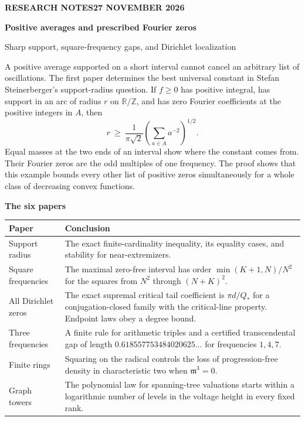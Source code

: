 \documentclass[11pt]{article}
\begin{document}
{\sffamily\color{pine}\small\bfseries RESEARCH NOTES\hfill 27 NOVEMBER 2026}\par
\vspace{9pt}
{\sffamily\bfseries\color{ink}\fontsize{26}{29}\selectfont Positive averages and prescribed Fourier zeros}\par
{\large Sharp support, square-frequency gaps, and Dirichlet localization}\par
\vspace{6pt}
A positive average supported on a short interval cannot cancel an arbitrary list of oscillations. The first paper determines the best universal constant in Stefan Steinerberger's support-radius question. If $f\ge0$ has positive integral, has support in an arc of radius $r$ on $\mathbb R/\mathbb Z$, and has zero Fourier coefficients at the positive integers in $A$, then
\[
                    r\ \ge\ \frac{1}{\pi\sqrt2}
                              \left(\sum_{a\in A}a^{-2}\right)^{1/2}.
\]
Equal masses at the two ends of an interval show where the constant comes from. Their Fourier zeros are the odd multiples of one frequency. The proof shows that this example bounds every other list of positive zeros simultaneously for a whole class of decreasing convex functions.

\vspace{4pt}
{\large\sffamily\bfseries\color{pine} The six papers}\par
\renewcommand{\arraystretch}{1.22}
{\small
\begin{tabularx}{\linewidth}{@{}p{.32\linewidth}Y@{}}
\toprule
\textbf{Paper} & \textbf{Conclusion}\\\midrule
Support radius & The exact finite-cardinality inequality, its equality cases, and stability for near-extremizers.\\
Square frequencies & The maximal zero-free interval has order $\min(K+1,N)/N^2$ for the squares from $N^2$ through $(N+K)^2$.\\
All Dirichlet zeros & The exact supremal critical tail coefficient is $\pi d/Q_*$ for a conjugation-closed family with the critical-line property. Endpoint laws obey a degree bound.\\
Three frequencies & A finite rule for arithmetic triples and a certified transcendental gap of length $0.618557753484020625\ldots$ for frequencies $1,4,7$.\\
Finite rings & Squaring on the radical controls the loss of progression-free density in characteristic two when $\mathfrak m^3=0$.\\
Graph towers & The polynomial law for spanning-tree valuations starts within a logarithmic number of levels in the voltage height in every fixed rank.\\
\bottomrule
\end{tabularx}}
\end{document}
